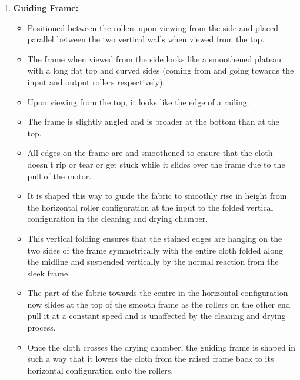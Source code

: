 \documentclass[table,french,english]{rapportCS}
\begin{document}
\begin{enumerate}[label=\arabic*.]
    \item \textbf{Guiding Frame:}
    \begin{itemize}[label=$\bullet$]
        \item Positioned between the rollers upon viewing from the side and placed parallel between the two vertical walls when viewed from the top.
        \item The frame when viewed from the side looks like a smoothened plateau with a long flat top and curved sides (coming from and going towards the input and output rollers respectively).
        \item Upon viewing from the top, it looks like the edge of a railing.
        \item The frame is slightly angled and is broader at the bottom than at the top.
        \item All edges on the frame are   and smoothened to ensure that the cloth doesn’t rip or tear or get stuck while it slides over the frame due to the pull of the motor.
        \item It is shaped this way to guide the fabric to smoothly rise in height from the horizontal roller configuration at the input to the folded vertical configuration in the cleaning and drying chamber.
        \item This vertical folding ensures that the stained edges are hanging on the two sides of the frame symmetrically with the entire cloth folded along the midline and suspended vertically by the normal reaction from the sleek frame.
        \item The part of the fabric towards the centre in the horizontal configuration now slides at the top of the smooth frame as the rollers on the other end pull it at a constant speed and is unaffected by the cleaning and drying process.
        \item Once the cloth crosses the drying chamber, the guiding frame is shaped in such a way that it lowers the cloth from the raised frame back to its horizontal configuration onto the rollers.
    \end{itemize}


\end{enumerate}
\end{document}
